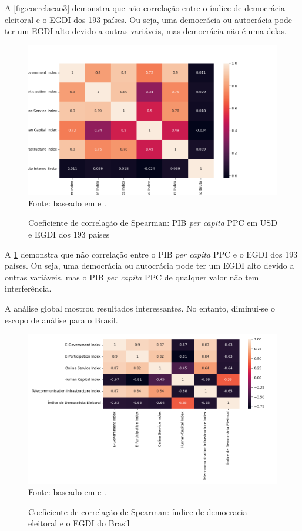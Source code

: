 A \ref{fig:correlacao3} demonstra que não correlação entre o índice de democrácia eleitoral e o EGDI dos 193 países. Ou seja, uma democrácia ou autocrácia pode ter um EGDI alto devido a outras variáveis, mas democrácia não é uma delas.

\begin{figure}[H]
    \centering
    \caption{Coeficiente de correlação de Spearman: PIB \textit{per capita} PPC em USD e EGDI dos 193 países}
    \includegraphics[width=1\linewidth]{figuras/egdi/correlacao4.png}
    \label{fig:correlacao4}
    \footnotesize{Fonte: baseado em \cite{ONU_edgi_mapa} e \cite{WB_pib_per_capita_paises}.}
\end{figure}

A \ref{fig:correlacao4} demonstra que não correlação entre o PIB \textit{per capita} PPC e o EGDI dos 193 países. Ou seja, uma democrácia ou autocrácia pode ter um EGDI alto devido a outras variáveis, mas o PIB \textit{per capita} PPC de qualquer valor não tem interferência.

A análise global mostrou resultados interessantes. No entanto, diminui-se o escopo de análise para o Brasil.

\begin{figure}[H]
    \centering
    \caption{Coeficiente de correlação de Spearman: índice de democracia eleitoral e o EGDI do Brasil}
    \includegraphics[width=1\linewidth]{figuras/egdi/correlacao8.png}
    \label{fig:correlacao8}
    \footnotesize{Fonte: baseado em \cite{ONU_edgi_mapa} e \cite{electoral_democracy_index}.}
\end{figure}

